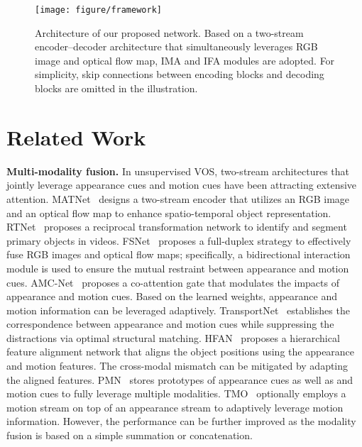 \documentclass[10pt,twocolumn,letterpaper]{article}
\begin{document}
\begin{figure*}[t]
\centering
\texttt{[image: figure/framework]}
\caption{Architecture of our proposed network. Based on a two-stream encoder--decoder architecture that simultaneously leverages RGB image and optical flow map, IMA and IFA modules are adopted. For simplicity, skip connections between encoding blocks and decoding blocks are omitted in the illustration.}
\label{figure2}
\end{figure*}




\section{Related Work}
\noindent\textbf{Multi-modality fusion.} In unsupervised VOS, two-stream architectures that jointly leverage appearance cues and motion cues have been attracting extensive attention. MATNet~\cite{MATNet} designs a two-stream encoder that utilizes an RGB image and an optical flow map to enhance spatio-temporal object representation. RTNet~\cite{RTNet} proposes a reciprocal transformation network to identify and segment primary objects in videos. FSNet~\cite{FSNet} proposes a full-duplex strategy to effectively fuse RGB images and optical flow maps; specifically, a bidirectional interaction module is used to ensure the mutual restraint between appearance and motion cues. AMC-Net~\cite{AMC-Net} proposes a co-attention gate that modulates the impacts of appearance and motion cues. Based on the learned weights, appearance and motion information can be leveraged adaptively. TransportNet~\cite{TransportNet} establishes the correspondence between appearance and motion cues while suppressing the distractions via optimal structural matching. HFAN~\cite{HFAN} proposes a hierarchical feature alignment network that aligns the object positions using the appearance and motion features. The cross-modal mismatch can be mitigated by adapting the aligned features. PMN~\cite{PMN} stores prototypes of appearance cues as well as and motion cues to fully leverage multiple modalities. TMO~\cite{TMO} optionally employs a motion stream on top of an appearance stream to adaptively leverage motion information. However, the performance can be further improved as the modality fusion is based on a simple summation or concatenation.
\end{document}
